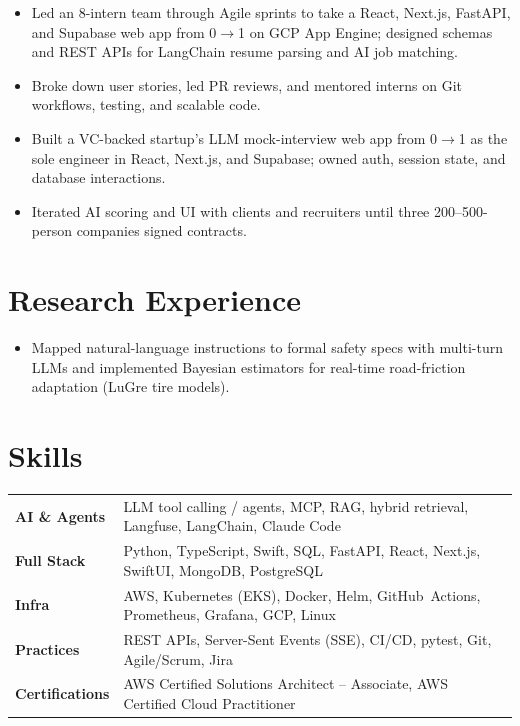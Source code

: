 \documentclass[11pt, letterpaper]{article}
\begin{document}
\vspace{1pt}
\begin{itemize}
  \item Led an 8-intern team through Agile sprints to take a React, Next.js, FastAPI, and Supabase web app from 0$\to$1 on GCP App Engine; designed schemas and REST APIs for LangChain resume parsing and AI job matching.
  \item Broke down user stories, led PR reviews, and mentored interns on Git workflows, testing, and scalable code.
\end{itemize}

\vspace{1pt}
\begin{itemize}
  \item Built a VC-backed startup's LLM mock-interview web app from 0$\to$1 as the sole engineer in React, Next.js, and Supabase; owned auth, session state, and database interactions.
  \item Iterated AI scoring and UI with clients and recruiters until three 200--500-person companies signed contracts.
\end{itemize}

\section{Research Experience}
\begin{itemize}
  \item Mapped natural-language instructions to formal safety specs with multi-turn LLMs and implemented Bayesian estimators for real-time road-friction adaptation (LuGre tire models).
\end{itemize}

\section{Skills}
\begin{tabularx}{\textwidth}{@{}l @{\hspace{7pt}} >{\raggedright\arraybackslash}X@{}}
  \textbf{AI \& Agents} & LLM tool calling / agents, MCP, RAG, hybrid retrieval, Langfuse, LangChain, Claude Code \\[1pt]
  \textbf{Full Stack} & Python, TypeScript, Swift, SQL, FastAPI, React, Next.js, SwiftUI, MongoDB, PostgreSQL \\[1pt]
  \textbf{Infra} & AWS, Kubernetes (EKS), Docker, Helm, GitHub~Actions, Prometheus, Grafana, GCP, Linux \\[1pt]
  \textbf{Practices} & REST APIs, Server-Sent Events (SSE), CI/CD, pytest, Git, Agile/Scrum, Jira \\[1pt]
  \textbf{Certifications} & AWS Certified Solutions Architect -- Associate, AWS Certified Cloud Practitioner \\
\end{tabularx}
\end{document}
